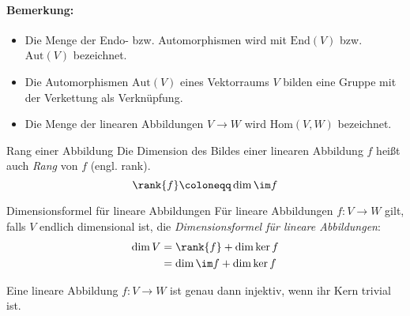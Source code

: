 \paragraph{Bemerkung:}
\begin{itemize}
	\item Die Menge der Endo- bzw. Automorphismen wird mit $\mathrm{End}(V)$ bzw. $\mathrm{Aut}(V)$ bezeichnet.
  \item Die Automorphismen $\mathrm{Aut}(V)$ eines Vektorraums $V$ bilden eine Gruppe mit der Verkettung als Verknüpfung.
	\item Die Menge der linearen Abbildungen $V\rightarrow W$ wird $\mathrm{Hom}(V,W)$ bezeichnet.
\end{itemize}


\begin{definition}{Rang einer Abbildung}
  Die Dimension des Bildes einer linearen Abbildung $f$ heißt auch \emph{Rang} von $f$ (engl. rank).
  \begin{equation*}
    \rank{f} \coloneqq \dim{\im f}
  \end{equation*}
\end{definition}

\begin{satz}{Dimensionsformel für lineare Abbildungen}
  Für lineare Abbildungen $f:V\rightarrow W$ gilt, falls $V$ endlich dimensional ist, die \emph{Dimensionsformel für lineare Abbildungen}:
  \begin{align*}
    \dim{V}&=\rank{f}+\dim{\ker f}\\
    &=\dim{\im f}+\dim{\ker f}
  \end{align*}
\end{satz}

\begin{lemma}{}
  Eine lineare Abbildung $f:V\rightarrow W$ ist genau dann injektiv, wenn ihr Kern trivial ist.
\end{lemma}

